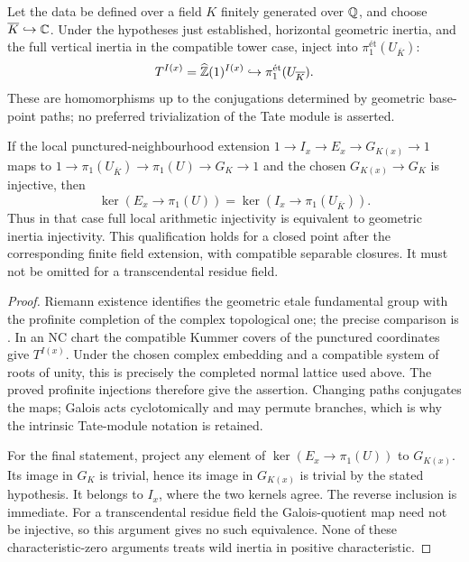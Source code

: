 \begin{corollary}\label{P3b-profinite}
Let the data be defined over a field $K$ finitely generated over
$\mathbb Q$, and choose $\overline K\hookrightarrow\mathbb C$. Under the
hypotheses just established, horizontal geometric inertia,
and the full vertical inertia in the compatible tower case,
inject into $\pi _1^{\text{ét}}(U_{\overline K})$:
\[
 T^{I(x)}=\widehat{\mathbb Z}(1)^{I(x)}
       \hookrightarrow\pi _1^{\text{ét}}(U_{\overline K}).
\]
These are homomorphisms up to the conjugations determined by
geometric base-point paths; no preferred trivialization of
the Tate module is asserted.

If the local punctured-neighbourhood extension
$1\to I_x\to E_x\to G_{K(x)}\to1$ maps to
$1\to\pi _1(U_{\overline K})\to\pi _1(U)\to G_K\to1$
and the chosen $G_{K(x)}\to G_K$ is injective, then
\[
 \ker(E_x\to\pi _1(U))
 =\ker(I_x\to\pi _1(U_{\overline K})).
\]
Thus in that case full local arithmetic injectivity is
equivalent to geometric inertia injectivity. This qualification
holds for a closed point after the corresponding finite field
extension, with compatible separable closures. It must not
be omitted for a transcendental residue field.
\end{corollary}
\begin{proof}
Riemann existence identifies the geometric etale fundamental
group with the profinite completion of the complex topological
one; the precise comparison is
\citet[Exposé XII, Théorème 5.1 and Corollaire 5.2]{SGA1}.
In an NC chart the compatible Kummer covers of the punctured
coordinates give $T^{I(x)}$. Under the chosen complex embedding
and a compatible system of roots of unity, this is precisely
the completed normal lattice used above. The proved profinite
injections therefore give the assertion. Changing paths
conjugates the maps; Galois acts cyclotomically and may permute
branches, which is why the intrinsic Tate-module notation is
retained.

For the final statement, project any element of
$\ker(E_x\to\pi _1(U))$ to $G_{K(x)}$. Its image in $G_K$ is
trivial, hence its image in $G_{K(x)}$ is trivial by the stated
hypothesis. It belongs to $I_x$, where the two kernels agree.
The reverse inclusion is immediate. For a transcendental
residue field the Galois-quotient map need not be injective,
so this argument gives no such equivalence. None of these
characteristic-zero arguments treats wild inertia in positive
characteristic.
\end{proof}

